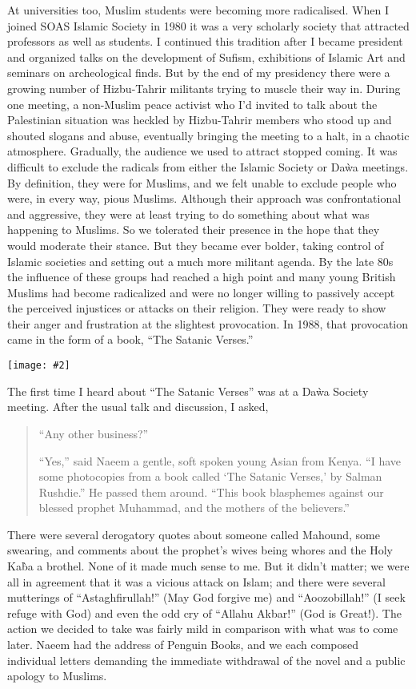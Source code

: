 \documentclass[12pt]{memoir}
\newcommand{\img}[3]{\begin{center}%
\texttt{[image: \#2]}\\{\small\em#3}%
\end{center}}
\begin{document}
At universities too, Muslim students were becoming more radicalised.
When I joined SOAS Islamic Society in 1980 it was a very scholarly society
that attracted professors as well as students.
I continued this tradition after I became president
and organized talks on the development of Sufism,
exhibitions of Islamic Art and seminars on archeological finds.
But by the end of my presidency there were a growing number
of Hizbu-Tahrir militants trying to muscle their way in.
During one meeting, a non-Muslim peace activist
who I’d invited to talk about the Palestinian situation was heckled
by Hizbu-Tahrir members who stood up and shouted slogans and abuse,
eventually bringing the meeting to a halt, in a chaotic atmosphere.
Gradually, the audience we used to attract stopped coming.
It was difficult to exclude the radicals
from either the Islamic Society or Da\`wa meetings.
By definition, they were for Muslims,
and we felt unable to exclude people who were, in every way, pious Muslims.
Although their approach was confrontational and aggressive,
they were at least trying to do something about what was happening to Muslims.
So we tolerated their presence in the hope
that they would moderate their stance.
But they became ever bolder,
taking control of Islamic societies
and setting out a much more militant agenda.
By the late 80s the influence of these groups had reached a high point
and many young British Muslims had become radicalized
and were no longer willing to passively accept
the perceived injustices or attacks on their religion.
They were ready to show their anger
and frustration at the slightest provocation.
In 1988, that provocation came in the form of a book, “The Satanic Verses.”

\img{scale=1}{Satanic_Verses_Demo.jpg}{}

The first time I heard about “The Satanic Verses”
was at a Da\`wa Society meeting.
After the usual talk and discussion, I asked,

\begin{quote}
“Any other business?”

“Yes,” said Naeem a gentle, soft spoken young Asian from Kenya.
“I have some photocopies from a book called ‘The Satanic Verses,’
by Salman Rushdie.”
He passed them around.
“This book blasphemes against our blessed prophet Muhammad,
and the mothers of the believers.”
\end{quote}

There were several derogatory quotes about someone called Mahound,
some swearing, and comments about the prophet’s wives
being whores and the Holy Ka\`ba a brothel.
None of it made much sense to me.
But it didn’t matter;
we were all in agreement that it was a vicious attack on Islam;
and there were several mutterings of “Astaghfirullah!”
(May God forgive me) and “Aoozobillah!” (I seek refuge with God)
and even the odd cry of “Allahu Akbar!” (God is Great!).
The action we decided to take was fairly mild
in comparison with what was to come later.
Naeem had the address of Penguin Books,
and we each composed individual letters demanding the immediate withdrawal
of the novel and a public apology to Muslims.
\end{document}
